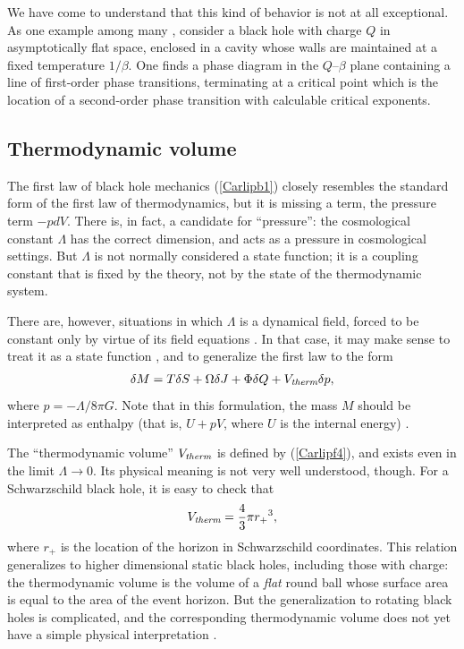 \documentclass[12pt]{article}
\begin{document}
We have come to understand that this kind of behavior is not at all
exceptional.  As one example among many \cite{CarlipVaidya}, 
consider a black hole with charge $Q$ in asymptotically flat 
space, enclosed in a cavity whose walls are maintained at a fixed
temperature $1/\beta$.  One finds a phase diagram in the $Q$--$\beta$ 
plane containing a line of first-order phase transitions, terminating 
at a critical point which is the location of a second-order phase transition
with calculable critical exponents.

\subsection{Thermodynamic volume}

The first law of black hole mechanics (\ref{Carlipb1}) closely
resembles the standard form of the first law of thermodynamics,
but it is missing a term, the  pressure term $-pdV$.  There
is, in fact, a candidate for ``pressure'': the
cosmological constant $\Lambda$ has the correct dimension, and
acts as a pressure in cosmological settings.  But $\Lambda$ is not
 normally considered a state function; it is a coupling constant that
 is fixed by the theory, not by the state of the thermodynamic system.

There are, however, situations in which $\Lambda$ is a dynamical
field, forced to be constant only by virtue of its field equations
\cite{HennTeit1}.  In that case, it may make sense to treat it as
a state function \cite{Caldarelli}, and to generalize the first law 
to the form \cite{Sekiwa,KRT}
\begin{align}
\delta M = T\delta S + \Omega \delta J + \Phi \delta Q 
    + V_{\hbox{\scriptsize\it therm}}\delta p  ,
\label{Carlipf4}
\end{align}
where $p = - {\Lambda}/{8\pi G}$.  Note that in this formulation, 
the mass $M$ should be interpreted as enthalpy (that is, $U+pV$,
where $U$ is the internal energy) \cite{KRT}.

The ``thermodynamic volume'' $V_{\hbox{\scriptsize\it therm}}$ 
is defined by (\ref{Carlipf4}), and exists even in the limit 
$\Lambda\rightarrow0$.  Its physical meaning is not very well 
understood, though.  For a Schwarzschild black hole, it is easy 
to check that
\begin{align}
V_{\hbox{\scriptsize\it therm}} = \frac{4}{3}\pi r_+{}^3   ,
\label{Carlipf5}
\end{align}
where $r_+$ is the location of the horizon in Schwarzschild coordinates.
This relation generalizes to higher dimensional static black holes,
including those with charge: the thermodynamic volume is the volume
of a \emph{flat} round ball whose surface area is equal to the area of the 
event horizon.  But the generalization to rotating black holes is complicated, 
and the corresponding thermodynamic volume does not yet have a simple
physical interpretation \cite{Cvetic}.
\end{document}
